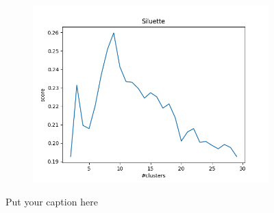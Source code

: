 \documentclass{article}
\begin{document}
\begin{figure}[H]
\begin{subfigure}{.33\textwidth}
  \label{fig:sub-second}
\end{subfigure}
\begin{subfigure}{.33\textwidth}
  \centering
  \includegraphics[width=1\linewidth]{2f/Dogs/Sillhouete.png}  
  
  \label{fig:sub-second}
\end{subfigure}
\caption{Put your caption here}
\label{int f dogs}
\end{figure}
\end{document}
